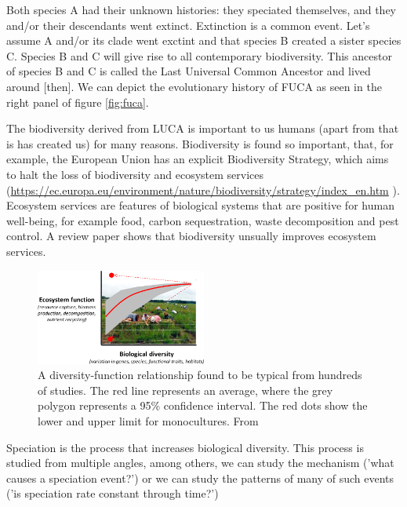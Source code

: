 Both species A had their unknown histories: they speciated themselves,
and they and/or their descendants went extinct. 
Extinction is a common event. Let's assume A and/or its clade went
exctint and that species B created a sister species C. Species B
and C will give rise to all contemporary biodiversity. This ancestor of species B and C 
is called the Last Universal Common Ancestor and lived around [then].
We can depict the evolutionary
history of FUCA as seen in the right panel of figure \ref{fig:fuca}.

The biodiversity derived from LUCA is important to us 
humans (apart from that is has created us) for many reasons.
Biodiversity is found so important, that, for example, 
the European Union has an explicit Biodiversity Strategy,
which aims to halt the loss of biodiversity and ecosystem 
services (\url{https://ec.europa.eu/environment/nature/biodiversity/strategy/index_en.htm}
).
Ecosystem services are features of biological systems that are 
positive for human well-being, for example food,
carbon sequestration, waste decomposition and pest control.
A review paper \cite{cardinale2012biodiversity} shows that 
biodiversity unsually improves ecosystem services.

\begin{figure}[H]
  \includegraphics[width=0.5\textwidth]{cardinale_et_al_fig_1.png}
  \caption{
    A diversity-function relationship found to be typical from hundreds
    of studies. The red line represents an average, where the grey polygon
    represents a 95\% confidence interval. The red dots show the lower
    and upper limit for monocultures. From \cite{cardinale2012biodiversity}
  }
  \label{fig:cardinale_et_al}
\end{figure}


Speciation is the process that increases biological diversity.
This process is studied from multiple angles, among others,
we can study the mechanism ('what
causes a speciation event?') or we can study the patterns of many
of such events ('is speciation rate constant through time?')

